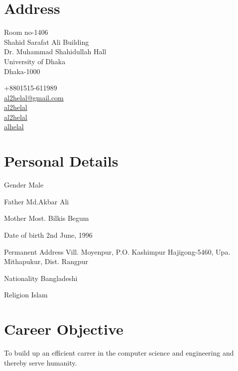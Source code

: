\documentclass[a4paper]{article}
\begin{document}
\section{Address}
\noindent
\begin{minipage}{.7\textwidth}
  Room no-1406\\
  Shahid Sarafat Ali Building\\
  Dr. Muhammad Shahidullah Hall\\
  University of Dhaka\\
  Dhaka-1000\\
\end{minipage}
\begin{minipage}{.7\textwidth}
  \faPhone{} +8801515-611989\\
  \faEnvelopeO{}  \href{mailto:al2helal@gmail.com}{al2helal@gmail.com}\\
  \faGithub{}  \href{https://github.com/al2helal}{al2helal}\\
  \faLinkedin{}  \href{https://www.linkedin.com/in/mdalhelal/}{al2helal}\\
  \faStackOverflow{}  \href{https://stackoverflow.com/users/5697418/alhelal}{alhelal}
\end{minipage}

\section{Personal Details}
\begin{CV}
  \item[Gender] Male 
  \item[Father] Md.Akbar Ali
  \item[Mother] Most. Bilkis Begum
  \item[Date of birth] 2nd June, 1996
  \item[Permanent Address] Vill. Moyenpur, P.O. Kashimpur Hajigong-5460, Upa. Mithapukur, Dist. Rangpur
  \item[Nationality] Bangladeshi
  \item[Religion] Islam
  \end{CV}

\section{Career Objective}
\begin{CV}
\item To build up an efficient carrer in the computer science and engineering and thereby serve humanity.
  \end{CV}
\end{document}
